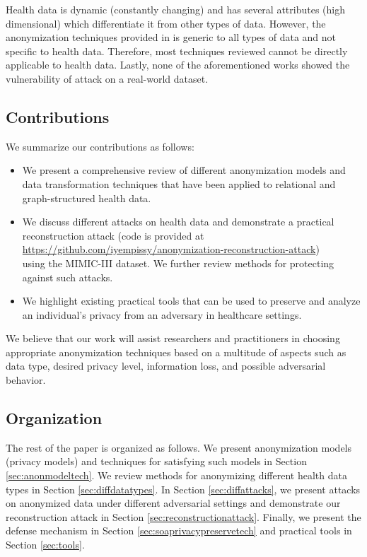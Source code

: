 \documentclass{bioinfo}
\begin{document}
Health data is dynamic (constantly changing) and has several attributes (high dimensional) which differentiate it from other types of data. However, the anonymization techniques provided in \cite{majeed2020anonymization} is generic to all types of data and not specific to health data. Therefore, most techniques reviewed cannot be directly applicable to health data.
Lastly, none of the aforementioned works showed the vulnerability of attack on a real-world dataset.


\subsection{Contributions}
We summarize our contributions as follows:
\begin{itemize}
    \item We present a comprehensive review of different anonymization models and data transformation techniques that have been applied to relational and graph-structured health data.
    \item We discuss different attacks on health data and demonstrate a practical reconstruction attack (code is provided at \url{https://github.com/iyempissy/anonymization-reconstruction-attack}) \\
    using the MIMIC-III dataset. We further review methods for protecting against such attacks.
    \item We highlight existing practical tools that can be used to preserve and analyze an individual's privacy from an adversary in healthcare settings. 
\end{itemize}
We believe that our work will assist researchers and practitioners in choosing appropriate anonymization techniques based on a multitude of aspects such as data type, desired privacy level, information loss, and possible adversarial behavior.
\subsection{Organization}
The rest of the paper is organized as follows. We present anonymization models (privacy models) and techniques for satisfying such models in Section \ref{sec:anonmodeltech}. We review methods for anonymizing different health data types in Section \ref{sec:diffdatatypes}. In Section \ref{sec:diffattacks}, we present attacks on anonymized data under different adversarial settings and demonstrate our reconstruction attack in Section \ref{sec:reconstructionattack}. Finally, we present the defense mechanism in Section \ref{sec:soaprivacypreservetech} and practical tools in Section \ref{sec:tools}.
\end{document}

